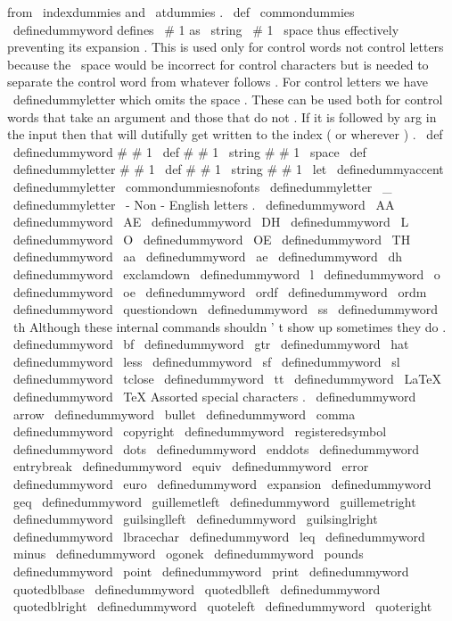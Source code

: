 {{{{from
\
indexdummies
and
\
atdummies
.
%
\
def
\
commondummies
{
%
%
%
\
definedummyword
defines
\
#
1
as
\
string
\
#
1
\
space
thus
effectively
%
preventing
its
expansion
.
This
is
used
only
for
control
words
%
not
control
letters
because
the
\
space
would
be
incorrect
for
%
control
characters
but
is
needed
to
separate
the
control
word
%
from
whatever
follows
.
%
%
For
control
letters
we
have
\
definedummyletter
which
omits
the
%
space
.
%
%
These
can
be
used
both
for
control
words
that
take
an
argument
and
%
those
that
do
not
.
If
it
is
followed
by
{
arg
}
in
the
input
then
%
that
will
dutifully
get
written
to
the
index
(
or
wherever
)
.
%
\
def
\
definedummyword
#
#
1
{
\
def
#
#
1
{
\
string
#
#
1
\
space
}
}
%
\
def
\
definedummyletter
#
#
1
{
\
def
#
#
1
{
\
string
#
#
1
}
}
%
\
let
\
definedummyaccent
\
definedummyletter
%
\
commondummiesnofonts
%
\
definedummyletter
\
_
%
\
definedummyletter
\
-
%
%
%
Non
-
English
letters
.
\
definedummyword
\
AA
\
definedummyword
\
AE
\
definedummyword
\
DH
\
definedummyword
\
L
\
definedummyword
\
O
\
definedummyword
\
OE
\
definedummyword
\
TH
\
definedummyword
\
aa
\
definedummyword
\
ae
\
definedummyword
\
dh
\
definedummyword
\
exclamdown
\
definedummyword
\
l
\
definedummyword
\
o
\
definedummyword
\
oe
\
definedummyword
\
ordf
\
definedummyword
\
ordm
\
definedummyword
\
questiondown
\
definedummyword
\
ss
\
definedummyword
\
th
%
%
Although
these
internal
commands
shouldn
'
t
show
up
sometimes
they
do
.
\
definedummyword
\
bf
\
definedummyword
\
gtr
\
definedummyword
\
hat
\
definedummyword
\
less
\
definedummyword
\
sf
\
definedummyword
\
sl
\
definedummyword
\
tclose
\
definedummyword
\
tt
%
\
definedummyword
\
LaTeX
\
definedummyword
\
TeX
%
%
Assorted
special
characters
.
\
definedummyword
\
arrow
\
definedummyword
\
bullet
\
definedummyword
\
comma
\
definedummyword
\
copyright
\
definedummyword
\
registeredsymbol
\
definedummyword
\
dots
\
definedummyword
\
enddots
\
definedummyword
\
entrybreak
\
definedummyword
\
equiv
\
definedummyword
\
error
\
definedummyword
\
euro
\
definedummyword
\
expansion
\
definedummyword
\
geq
\
definedummyword
\
guillemetleft
\
definedummyword
\
guillemetright
\
definedummyword
\
guilsinglleft
\
definedummyword
\
guilsinglright
\
definedummyword
\
lbracechar
\
definedummyword
\
leq
\
definedummyword
\
minus
\
definedummyword
\
ogonek
\
definedummyword
\
pounds
\
definedummyword
\
point
\
definedummyword
\
print
\
definedummyword
\
quotedblbase
\
definedummyword
\
quotedblleft
\
definedummyword
\
quotedblright
\
definedummyword
\
quoteleft
\
definedummyword
\
quoteright
}}}}}
